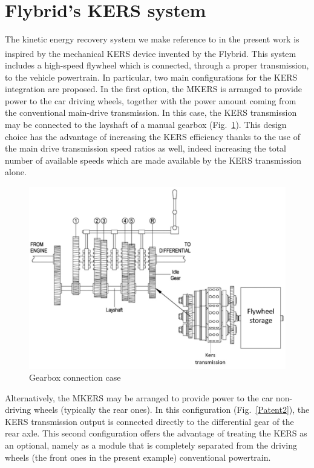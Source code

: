 \documentclass[11pt]{article}
\begin{document}
\section{Flybrid's KERS system}

The kinetic energy recovery system we make reference to in the present work is inspired by the mechanical KERS device invented by the Flybrid\textsuperscript\textregistered \cite{n}. This system includes a high-speed flywheel which is connected, through a proper transmission, to the vehicle powertrain. In particular, two main configurations for the KERS integration are proposed. In the first option, the MKERS is arranged to provide power to the car driving wheels, together with the power amount coming from the conventional main-drive transmission. In this case, the KERS transmission may be connected to the layshaft of a manual gearbox (Fig.~\ref{Patent1}). This design choice has the advantage of increasing the KERS efficiency thanks to the use of the main drive transmission speed ratios as well, indeed increasing the total number of available speeds which are made available by the KERS transmission alone. 

\begin{figure}[H]
\centering
\includegraphics[width=.7\textwidth]{Images/State_of_the_art/Patent1}
\caption{Gearbox connection case}
\label{Patent1}
\end{figure}

Alternatively, the MKERS may be arranged to provide power to the car non-driving wheels (typically the rear ones). In this configuration (Fig.~\ref{Patent2}), the KERS transmission output is connected directly to the differential gear of the rear axle. This second configuration offers the advantage of treating the KERS as an optional, namely as a module that is completely separated from the driving wheels (the front ones in the present example) conventional powertrain.
\end{document}
